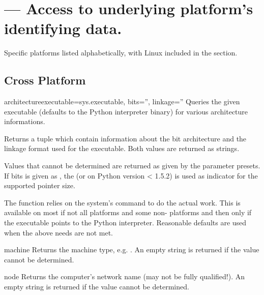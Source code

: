 \section{ --- 
   Access to underlying platform's identifying data.}



\begin{notice}
  Specific platforms listed alphabetically, with Linux included in the
  \UNIX{} section.
\end{notice}

\subsection{Cross Platform}

\begin{funcdesc}{architecture}{executable=sys.executable, bits='', linkage=''}
  Queries the given executable (defaults to the Python interpreter
  binary) for various architecture informations.

  Returns a tuple  which contain information about
  the bit architecture and the linkage format used for the
  executable. Both values are returned as strings.

  Values that cannot be determined are returned as given by the
  parameter presets. If bits is given as , the
  (or  on Python version < 1.5.2) is used as
  indicator for the supported pointer size.

  The function relies on the system's  command to do the
  actual work. This is available on most if not all \UNIX{} 
  platforms and some non-\UNIX{} platforms and then only if the
  executable points to the Python interpreter.  Reasonable defaults
  are used when the above needs are not met.
\end{funcdesc}

\begin{funcdesc}{machine}{}
  Returns the machine type, e.g. .
  An empty string is returned if the value cannot be determined.
\end{funcdesc}

\begin{funcdesc}{node}{}
  Returns the computer's network name (may not be fully qualified!).
  An empty string is returned if the value cannot be determined.
\end{funcdesc}

